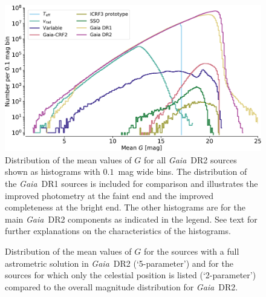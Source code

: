 \documentclass[longauth]{aa_gaia} %
\newcommand\gaia{\textit{Gaia}}
\newcommand\gdr[1]{\gaia~DR#1}
\begin{document}
\begin{figure}[t]
  \sidecaption
  \includegraphics[width=12cm]{figures/GaiaDR2-Magnitude-Distribution.pdf}
  \caption{Distribution of the mean values of $G$ for all \gdr{2} sources shown as histograms with
    $0.1$~mag wide bins. The distribution of the \gdr{1} sources is included for comparison and
    illustrates the improved photometry at the faint end and the improved completeness at the bright
    end. The other histograms are for the main \gdr{2} components as indicated in the legend. See
  text for further explanations on the characteristics of the histograms.\label{fig:gmaghistos}}
\end{figure}

\begin{figure}[t]
  \caption{Distribution of the mean values of $G$ for the sources with a full astrometric solution
    in \gdr{2} (`5-parameter') and for the sources for which only the celestial position is listed
    (`2-parameter') compared to the overall magnitude distribution for \gdr{2}.
  \label{fig:gmaghistoastrometry}}
\end{figure}
\end{document}
